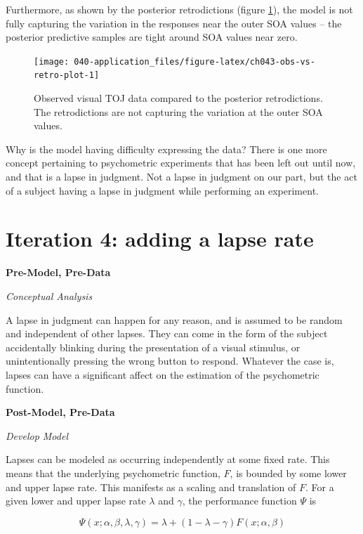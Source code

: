 \documentclass[11pt, oneside, openany]{scrbook}
\begin{document}
Furthermore, as shown by the posterior retrodictions (figure \ref{fig:ch043-obs-vs-retro-plot}), the model is not fully capturing the variation in the responses near the outer SOA values -- the posterior predictive samples are tight around SOA values near zero.

\begin{figure}

{\centering \texttt{[image: 040-application\_files/figure-latex/ch043-obs-vs-retro-plot-1]} 

}

\caption{Observed visual TOJ data compared to the posterior retrodictions. The retrodictions are not capturing the variation at the outer SOA values.}\label{fig:ch043-obs-vs-retro-plot}
\end{figure}

Why is the model having difficulty expressing the data? There is one more concept pertaining to psychometric experiments that has been left out until now, and that is a lapse in judgment. Not a lapse in judgment on our part, but the act of a subject having a lapse in judgment while performing an experiment.

\hypertarget{iter4}{%
\section{Iteration 4: adding a lapse rate}\label{iter4}}

\textbf{Pre-Model, Pre-Data}

\emph{Conceptual Analysis}

A lapse in judgment can happen for any reason, and is assumed to be random and independent of other lapses. They can come in the form of the subject accidentally blinking during the presentation of a visual stimulus, or unintentionally pressing the wrong button to respond. Whatever the case is, lapses can have a significant affect on the estimation of the psychometric function.

\textbf{Post-Model, Pre-Data}

\emph{Develop Model}

Lapses can be modeled as occurring independently at some fixed rate. This means that the underlying psychometric function, \(F\), is bounded by some lower and upper lapse rate. This manifests as a scaling and translation of \(F\). For a given lower and upper lapse rate \(\lambda\) and \(\gamma\), the performance function \(\Psi\) is

\[
\Psi(x; \alpha, \beta, \lambda, \gamma) = \lambda + (1 - \lambda - \gamma) F(x; \alpha, \beta)
\]
\end{document}
